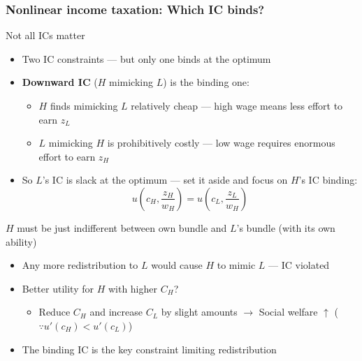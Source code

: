 \documentclass[aspectratio=169]{beamer}
\begin{document}
\begin{frame}
\frametitle{Nonlinear income taxation: Which IC binds?}
Not all ICs matter
\begin{itemize}\setlength\itemsep{3pt}
\item Two IC constraints --- but only one binds at the optimum
\item \textbf{Downward IC} ($H$ mimicking $L$) is the binding one:
\begin{itemize}\setlength\itemsep{3pt}
    \item $H$ finds mimicking $L$ relatively cheap --- high wage means less effort to earn $z_L$
    \item $L$ mimicking $H$ is prohibitively costly --- low wage requires enormous effort to earn $z_H$
\end{itemize}
\item So $L$'s IC is slack at the optimum --- set it aside and focus on $H$'s IC binding:
\[
u\!\left(c_H, \frac{z_H}{w_H}\right) = u\!\left(c_L, \frac{z_L}{w_H}\right)
\]
\end{itemize}
$H$ must be just indifferent between own bundle and $L$'s bundle (with its own ability)
\begin{itemize}\setlength\itemsep{3pt}
    \item Any more redistribution to $L$ would cause $H$ to mimic $L$ --- IC violated
    \item Better utility for $H$ with higher $C_H$? 
    \begin{itemize}
    \item Reduce $C_H$ and increase $C_L$ by slight amounts $\to$ Social welfare $\uparrow$ ($\because u'(c_H)<u'(c_L)$)
    \end{itemize}
    
    \item The binding IC is the key constraint limiting redistribution
\end{itemize}
\end{frame}
\end{document}
